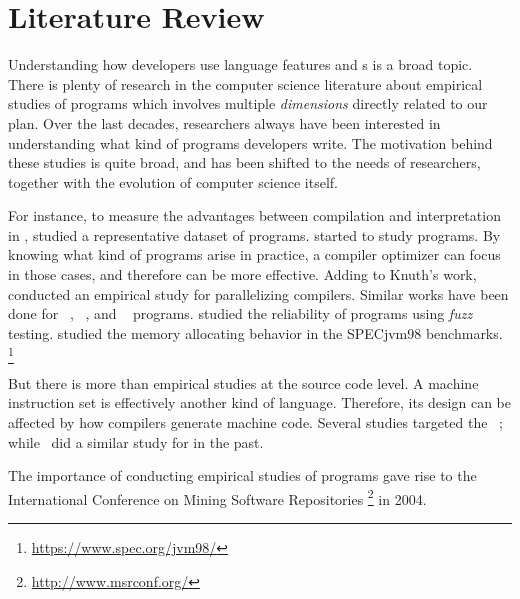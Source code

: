 \chapter{Literature Review}
\label{cha:literature-review}

Understanding how developers use language features
and \api{}s is a broad topic.
There is plenty of research in the computer science literature about
empirical studies of programs which involves multiple \emph{dimensions}
directly related to our plan.
Over the last decades,
researchers always have been interested in understanding what
kind of programs developers write.
The motivation behind these studies is quite broad,
and has been shifted to the needs of researchers,
together with the evolution of computer science itself.

For instance, to measure the advantages between compilation and interpretation in \basic{},
\cite{hammondBASICEvaluationProcessing1977} studied a representative dataset of programs.
\cite{knuthEmpiricalStudyFORTRAN1971} started to study \fortran{} programs.
By knowing what kind of programs arise in practice,
a compiler optimizer can focus in those cases,
and therefore can be more effective.
Adding to Knuth's work,%
~\cite{shenEmpiricalStudyFortran1990} conducted an empirical study for
parallelizing compilers.
Similar works have been done for
\cobol{}~\cite{salvadoriStaticProfileCOBOL1975,chevanceStaticProfileDynamic1978},
\pascal{}~\cite{cookContextualAnalysisPascal1982},
and \apl{}~\cite{saalPropertiesAPLPrograms1975,saalEmpiricalStudyAPL1977} programs.
\cite{millerEmpiricalStudyReliability1990,millerFuzzRevisitedReexamination1995,forresterEmpiricalStudyRobustness2000}
studied the reliability of programs using \emph{fuzz} testing.
\cite{dieckmannStudyAllocationBehavior1999} studied the memory allocating
behavior in the SPECjvm98 benchmarks.%
\footnote{\url{https://www.spec.org/jvm98/}}

But there is more than empirical studies at the source code level.
A machine instruction set is effectively another kind of language.
Therefore, its design can be affected by how compilers generate machine code.
Several studies targeted the \jvm{}~\cite{collbergEmpiricalStudyJava2007,odonoghueBigramAnalysisJava2002,antonioliAnalysisJavaClass1998};
while~\cite{cookEmpiricalAnalysisLilith1989} did a similar study for \lilith{} in the past.

The importance of conducting empirical studies of programs gave rise to the International Conference on Mining Software Repositories%
\footnote{\url{http://www.msrconf.org/}}
in 2004.

